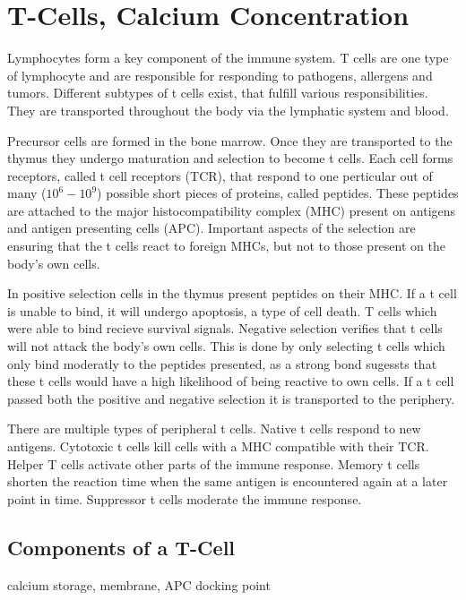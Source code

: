 \chapter{T-Cells, Calcium Concentration}
\label{chapter:t-cell}

Lymphocytes form a key component of the immune system. T cells are one type of lymphocyte and are responsible for responding to pathogens, allergens and tumors. Different subtypes of t cells exist, that fulfill various responsibilities. They are transported throughout the body via the lymphatic system and blood.\cite{Kumar2018}

Precursor cells are formed in the bone marrow. Once they are transported to the thymus they undergo maturation and selection to become t cells. Each cell forms receptors, called t cell receptors (TCR), that respond to one perticular out of many ($10^6 - 10^9$) possible short pieces of proteins, called peptides. These peptides are attached to the major histocompatibility complex (MHC) present on antigens and antigen presenting cells (APC). Important aspects of the selection are ensuring that the t cells react to foreign MHCs, but not to those present on the body's own cells.\cite{Ashby2024}

In positive selection cells in the thymus present peptides on their MHC. If a t cell is unable to bind, it will undergo apoptosis, a type of cell death. T cells which were able to bind recieve survival signals. Negative selection verifies that t cells will not attack the body's own cells. This is done by only selecting t cells which only bind moderatly to the peptides presented, as a strong bond sugessts that these t cells would have a high likelihood of being reactive to own cells.\cite{Hagel2018} If a t cell passed both the positive and negative selection it is transported to the periphery.

There are multiple types of peripheral t cells. Native t cells respond to new antigens. Cytotoxic t cells kill cells with a MHC compatible with their TCR. Helper T cells activate other parts of the immune response. Memory t cells shorten the reaction time when the same antigen is encountered again at a later point in time. Suppressor t cells moderate the immune response.\cite{Ganong1997}

\section{Components of a T-Cell}

calcium storage, membrane, APC docking point

